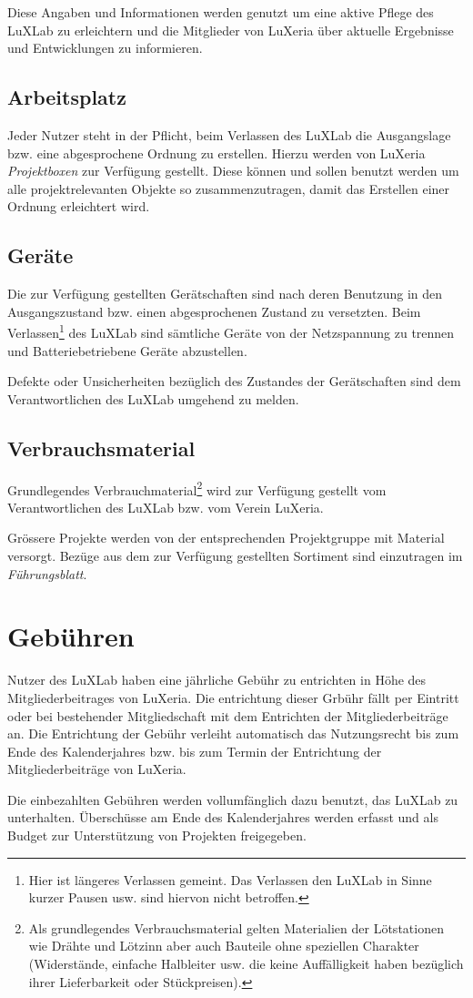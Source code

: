 \documentclass[a4paper,
               10pt,
               fleqn]{article}
\begin{document}
Diese Angaben und Informationen werden genutzt um eine aktive Pflege des
LuXLab zu erleichtern und die Mitglieder von LuXeria über aktuelle
Ergebnisse und Entwicklungen zu informieren.

\subsection{Arbeitsplatz}
Jeder Nutzer steht in der Pflicht, beim Verlassen des LuXLab die
Ausgangslage bzw. eine abgesprochene Ordnung zu erstellen. Hierzu
werden von LuXeria \emph{Projektboxen} zur Verfügung gestellt. Diese
können und sollen benutzt werden um alle projektrelevanten Objekte 
so zusammenzutragen, damit das Erstellen einer Ordnung erleichtert wird.
 
\subsection{Geräte}
Die zur Verfügung gestellten Gerätschaften sind nach deren Benutzung in
den Ausgangszustand bzw. einen abgesprochenen Zustand zu versetzten.
Beim Verlassen\footnote{
    Hier ist längeres Verlassen gemeint. Das Verlassen den LuXLab in 
    Sinne kurzer Pausen usw. sind hiervon nicht betroffen.}
des LuXLab sind sämtliche Geräte von der Netzspannung zu trennen und 
Batteriebetriebene Geräte abzustellen.

Defekte oder Unsicherheiten bezüglich des Zustandes der Gerätschaften 
sind dem Verantwortlichen des LuXLab umgehend zu melden.

\subsection{Verbrauchsmaterial}
Grundlegendes Verbrauchmaterial\footnote{
    Als grundlegendes Verbrauchsmaterial gelten Materialien der
    Lötstationen wie Drähte und Lötzinn aber auch Bauteile ohne
    speziellen Charakter (Widerstände, einfache Halbleiter usw. 
    die keine Auffälligkeit haben bezüglich ihrer Lieferbarkeit
    oder Stückpreisen).}
wird zur Verfügung gestellt vom Verantwortlichen des LuXLab bzw.
vom Verein LuXeria.

Grössere Projekte werden von der entsprechenden Projektgruppe
mit Material versorgt. Bezüge aus dem zur Verfügung gestellten 
Sortiment sind einzutragen im \emph{Führungsblatt}.

\section{Gebühren}
Nutzer des LuXLab haben eine jährliche Gebühr zu entrichten in
Höhe des Mitgliederbeitrages von LuXeria.
Die entrichtung dieser Grbühr fällt per Eintritt oder bei
bestehender Mitgliedschaft mit dem Entrichten der
Mitgliederbeiträge an. Die Entrichtung der Gebühr verleiht
automatisch das Nutzungsrecht bis zum Ende des Kalenderjahres
bzw. bis zum Termin der Entrichtung der Mitgliederbeiträge 
von LuXeria.

Die einbezahlten Gebühren werden vollumfänglich dazu benutzt, 
das LuXLab zu unterhalten. Überschüsse am Ende des Kalenderjahres 
werden erfasst und als Budget zur Unterstützung von Projekten
freigegeben.

\end{document}
